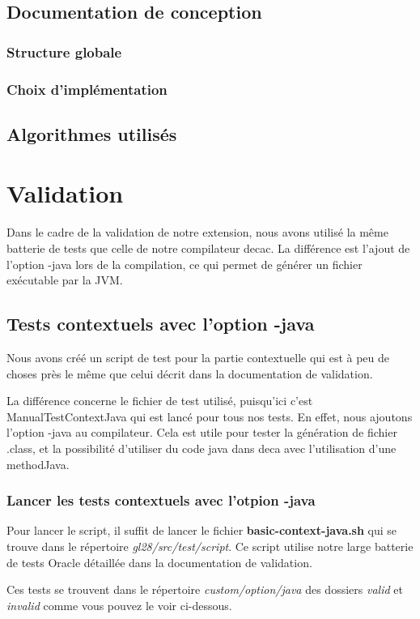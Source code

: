 \documentclass[12pt, a4paper, one side]{article}
\begin{document}
    \subsection{Documentation de conception}
    \subsubsection{Structure globale}
    \subsubsection{Choix d'implémentation}
    \subsection{Algorithmes utilisés}

    \section{Validation}
    Dans le cadre de la validation de notre extension, nous avons utilisé la même batterie de tests que celle de notre compilateur decac. La différence est l'ajout de l'option -java lors de la compilation, ce qui permet de générer un fichier exécutable par la JVM.

    \subsection{Tests contextuels avec l'option -java}
    Nous avons créé un script de test pour la partie contextuelle qui est à peu de choses près le même que celui décrit dans la documentation de validation.
    \begin{flushleft}
        La différence concerne le fichier de test utilisé, puisqu'ici c'est ManualTestContextJava qui est lancé pour tous nos tests. En effet, nous ajoutons l'option -java au compilateur. Cela est utile pour tester la génération de fichier .class, et la possibilité d'utiliser du code java dans deca avec l'utilisation d'une methodJava.
    \end{flushleft}

    \subsubsection{Lancer les tests contextuels avec l'otpion -java}
    Pour lancer le script, il suffit de lancer le fichier \textbf{basic-context-java.sh} qui se trouve dans le répertoire \textit{gl28/src/test/script}. Ce script utilise notre large batterie de tests Oracle détaillée dans la documentation de validation.
    \begin{flushleft}
        Ces tests se trouvent dans le répertoire \textit{custom/option/java} des dossiers \textit{valid} et \textit{invalid} comme vous pouvez le voir ci-dessous.
    \end{flushleft}
\end{document}
